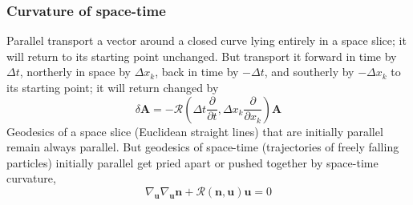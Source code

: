 \subsubsection{Curvature of space-time}
Parallel transport a vector around a closed curve lying entirely in a space slice; it will return to its starting point unchanged.
But transport it forward in time by $\Delta t$, northerly in space by $\Delta x_k$, back in time by $-\Delta t$, and southerly by $-\Delta x_k$ to its starting point; it will return changed by
\[\delta \bm{A} = -\mathcal{R}(\Delta t \frac{\partial}{\partial t},\Delta x_k \frac{\partial}{\partial x_k}) \bm{A}\]
Geodesics of a space slice (Euclidean straight lines) that are initially parallel remain always parallel. But geodesics of space-time (trajectories of freely falling particles) initially parallel get pried apart or pushed together by space-time curvature,
\[\nabla_{\bm{u}} \nabla_{\bm{u}} \bm{n} + \mathcal{R}(\bm{n},\bm{u})\bm{u} = 0\]

